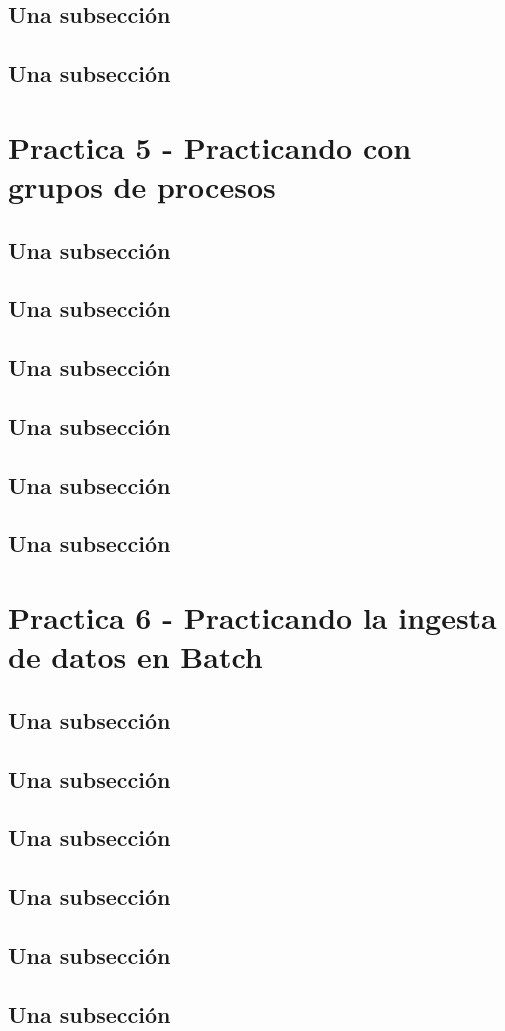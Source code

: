 \documentclass[12pt,a4paper]{article}
\begin{document}
\subsection{Una subsección}
\subsection{Una subsección}
\section{Practica 5 - Practicando con grupos de procesos}
\subsection{Una subsección}
\subsection{Una subsección}
\subsection{Una subsección}
\subsection{Una subsección}
\subsection{Una subsección}
\subsection{Una subsección}
\section{Practica 6 - Practicando la ingesta de datos en Batch}
\subsection{Una subsección}
\subsection{Una subsección}
\subsection{Una subsección}
\subsection{Una subsección}
\subsection{Una subsección}
\subsection{Una subsección}
\end{document}
